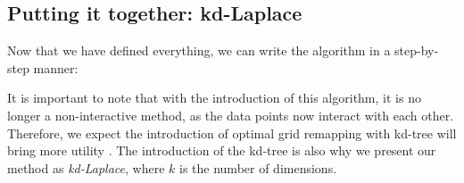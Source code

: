 
\newpage
\subsection{Putting it together: kd-Laplace}
Now that we have defined everything, we can write the algorithm in a step-by-step manner:


It is important to note that with the introduction of this algorithm, it is no longer a non-interactive method, as the data points now interact with each other.
Therefore, we expect the introduction of optimal grid remapping with kd-tree will bring more utility \citep{wang_comprehensive_2020, xiongComprehensiveSurveyLocal2020}.
The introduction of the kd-tree is also why we present our method as \textit{kd-Laplace}, where $k$ is the number of dimensions.



\newpage



